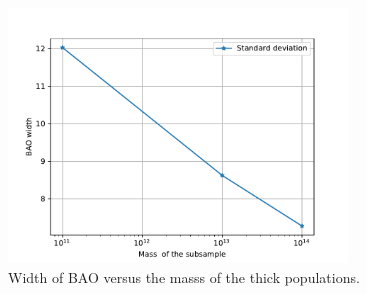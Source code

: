 \begin{figure}[htbp]
       \centering

    \includegraphics[width=90mm]{Images/chapter4/Width_vs_Mh.pdf}
\caption{\small Width of BAO versus the masss of the thick populations.}
       \label{sigm1}
 \end{figure}

